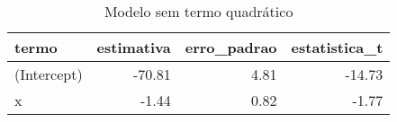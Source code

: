 \begin{table}

\caption{\label{tab:tabela1_exemplo4}Modelo sem termo quadrático}
\centering
\begin{tabular}[t]{l|r|r|r}
\hline
termo & estimativa & erro\_padrao & estatistica\_t\\
\hline
(Intercept) & -70.81 & 4.81 & -14.73\\
\hline
x & -1.44 & 0.82 & -1.77\\
\hline
\end{tabular}
\end{table}

